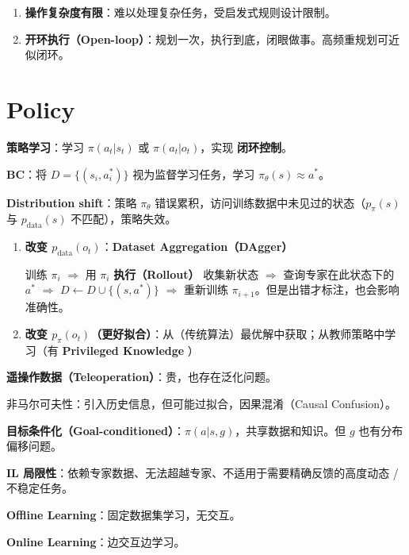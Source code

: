 \documentclass[
  8pt]{extarticle}
\providecommand{\tightlist}{%
  \setlength{\itemsep}{0pt}\setlength{\parskip}{0pt}}
\begin{document}
\begin{multicols*}{4}
\begin{enumerate}
\def\labelenumi{\arabic{enumi}.}
\tightlist
\item
  \textbf{操作复杂度有限}：难以处理复杂任务，受启发式规则设计限制。
\item
  \textbf{开环执行（Open-loop）}：规划一次，执行到底，闭眼做事。高频重规划可近似闭环。
\end{enumerate}

\hypertarget{policy}{%
\section{Policy}\label{policy}}

\textbf{策略学习}：学习 \(\pi(a_t|s_t)\) 或 \(\pi(a_t|o_t)\)，实现
\textbf{闭环控制}。

\textbf{BC}：将 \(D = \{(s_i, a_i^*)\}\) 视为监督学习任务，学习
\(\pi_\theta(s) \approx a^*\)。

\textbf{Distribution shift}：策略 \(\pi_\theta\)
错误累积，访问训练数据中未见过的状态（\(p_\pi(s)\) 与
\(p_{\text{data}}(s)\) 不匹配），策略失效。

\begin{enumerate}
\def\labelenumi{\arabic{enumi}.}
\item
  \textbf{改变 \(p_{\text{data}}(o_t)\)}：\textbf{Dataset
  Aggregation（DAgger）}

  训练 \(\pi_i\) \(\Rightarrow\) 用 \(\pi_i\) \textbf{执行（Rollout）}
  收集新状态 \(\Rightarrow\) 查询专家在此状态下的 \(a^*\)
  \(\Rightarrow\) \(D \leftarrow D \cup \{(s, a^*)\}\) \(\Rightarrow\)
  重新训练 \(\pi_{i+1}\)。但是出错才标注，也会影响准确性。
\item
  \textbf{改变
  \(p_{\pi}(o_t)\)（更好拟合）}：从（传统算法）最优解中获取；从教师策略中学习（有
  \textbf{Privileged Knowledge} ）
\end{enumerate}

\textbf{遥操作数据（Teleoperation）}：贵，也存在泛化问题。

非马尔可夫性：引入历史信息，但可能过拟合，因果混淆（Causal Confusion）。

\textbf{目标条件化（Goal-conditioned）}：\(\pi(a|s, g)\)，共享数据和知识。但
\(g\) 也有分布偏移问题。

\textbf{IL
局限性}：依赖专家数据、无法超越专家、不适用于需要精确反馈的高度动态 /
不稳定任务。

\textbf{Offline Learning}：固定数据集学习，无交互。

\textbf{Online Learning}：边交互边学习。


\end{multicols*}
\end{document}
